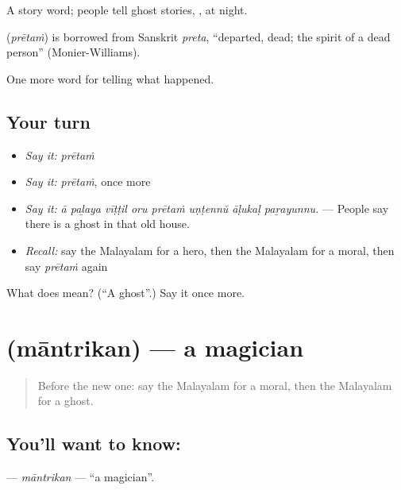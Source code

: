 A story word; people tell ghost stories, , at night.

\begin{cousinweb}
\textbf{} (\emph{prētaṁ}) is borrowed from Sanskrit \emph{preta}, \textquotedblleft{}departed, dead; the spirit of a dead person\textquotedblright{} (Monier-Williams).
\end{cousinweb}

\begin{grammarlens}[title={What you've built}]
One more word for telling what happened.
\end{grammarlens}

\subsection*{Your turn}
\begin{itemize}
\raggedright
  \item \emph{Say it:} \emph{prētaṁ}
  \item \emph{Say it:} \emph{prētaṁ}, once more
  \item \emph{Say it:} \emph{ā paḻaya vīṭṭil oru prētaṁ uṇṭennŭ āḷukaḷ paṟayunnu.} — People say there is a ghost in that old house.
  \item \emph{Recall:} say the Malayalam for a hero, then the Malayalam for a moral, then say \emph{prētaṁ} again
\end{itemize}

\begin{tcolorbox}[breakable,colback=teal!4,colframe=teal!35!black,title={Before you move on}]
What does  mean? (\textquotedblleft{}A ghost\textquotedblright{}.) Say it once more.
\end{tcolorbox}
\section[\texorpdfstring{\ml{മാന്ത്രികൻ} (māntrikan)}{മാന്ത്രികൻ (māntrikan)}]{ (māntrikan) — a magician}

\label{lesson:ML-C403-mantrikan}



\begin{quote}
Before the new one: say the Malayalam for a moral, then the Malayalam for a ghost.
\end{quote}

\subsection*{You'll want to know: }
\textbf{} — \emph{māntrikan} — \textquotedblleft{}a magician\textquotedblright{}.


